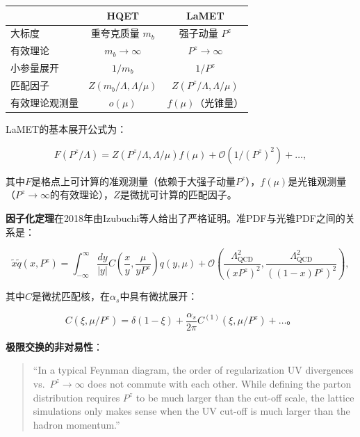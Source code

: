\documentclass[12pt,a4paper]{ctexart}
\theoremstyle{definition}
\begin{document}
\begin{center}
\begin{tabular}{lcc}
\toprule
& HQET & LaMET \\
\midrule
大标度        & 重夸克质量 $m_b$ & 强子动量 $P^z$ \\
有效理论      & $m_b \to \infty$ & $P^z \to \infty$ \\
小参量展开    & $1/m_b$          & $1/P^z$ \\
匹配因子      & $Z(m_b/\Lambda, \Lambda/\mu)$ & $Z(P^z/\Lambda, \Lambda/\mu)$ \\
有效理论观测量 & $o(\mu)$         & $f(\mu)$（光锥量） \\
\bottomrule
\end{tabular}
\end{center}

LaMET的基本展开公式为\cite{Ji2014LaMET}：

\begin{equation}
F(P^z/\Lambda) = Z(P^z/\Lambda, \Lambda/\mu) f(\mu) + \mathcal{O}(1/(P^z)^2) + \ldots,
\label{eq:LaMET_expansion}
\end{equation}

其中$F$是格点上可计算的准观测量（依赖于大强子动量$P^z$），$f(\mu)$是光锥观测量（$P^z \to \infty$的有效理论），$Z$是微扰可计算的匹配因子。

\textbf{因子化定理}在2018年由Izubuchi等人给出了严格证明\cite{Izubuchi2018}。准PDF与光锥PDF之间的关系是：

\begin{equation}
\tilde{x}\tilde{q}(x, P^z) = \int_{-\infty}^{\infty} \frac{dy}{|y|} C\left(\frac{x}{y}, \frac{\mu}{yP^z}\right) q(y, \mu) + \mathcal{O}\left(\frac{\Lambda_{\text{QCD}}^2}{(xP^z)^2}, \frac{\Lambda_{\text{QCD}}^2}{((1-x)P^z)^2}\right),
\label{eq:factorization}
\end{equation}

其中$C$是微扰匹配核，在$\alpha_s$中具有微扰展开：

\begin{equation}
C(\xi, \mu/P^z) = \delta(1-\xi) + \frac{\alpha_s}{2\pi} C^{(1)}(\xi, \mu/P^z) + \ldots。
\label{eq:matching_kernel}
\end{equation}

\textbf{极限交换的非对易性}\cite{Ji2013Euclidean, Ji2014LaMET}：

\begin{quote}
``In a typical Feynman diagram, the order of regularization UV divergences vs.\ $P^z \to \infty$ does not commute with each other. While defining the parton distribution requires $P^z$ to be much larger than the cut-off scale, the lattice simulations only makes sense when the UV cut-off is much larger than the hadron momentum.''
\end{quote}
\end{document}
